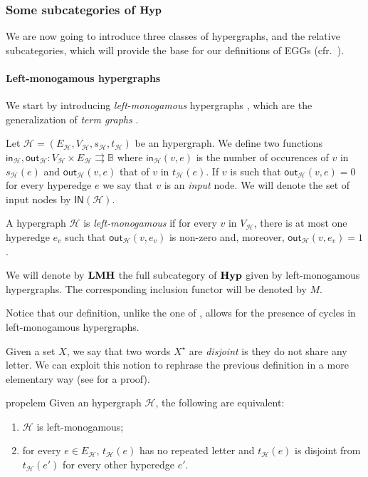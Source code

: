 \documentclass[3p]{elsarticle}
\newcommand{\ind}[1]{\mathsf{in}_{\mathcal{#1}}}
\newcommand{\ino}[1]{\mathsf{IN}({\mathcal{#1}})}
\newcommand{\outd}[1]{\mathsf{out}_{\mathcal{#1}}}
\newcommand{\catname}[1]{\textbf{\textup{#1}}}
\newcommand{\lmo}{\catname{LMH}}
\newcommand{\hyp}{\catname{Hyp}}
\theoremstyle{remark}
\theoremstyle{definition}
\begin{document}
\subsubsection{Some  subcategories of $\hyp$}

We are now going to introduce three classes of hypergraphs, and the relative subcategories, which will provide the base for our definitions of EGGs  (cfr.~). 


\paragraph{Left-monogamous hypergraphs}\label{par:lm}
We start by introducing \emph{left-monogamous} hypergraphs \cite{milosavljevic2023string,fritz2023free}, which are the generalization of \emph{term graphs} \cite{corradini2005term,Plu:TGR-ENTCS}.  

\begin{defi}
	Let $\mathcal{H}=(E_{\mathcal{H}}, V_{\mathcal{H}}, s_{\mathcal{H}}, t_{\mathcal{H}})$ be an hypergraph. We define two functions $\ind{H}, \outd{H}\colon V_{\mathcal{H}}\times E_{\mathcal{H}}\rightrightarrows \mathbb{B}$ where $\ind{H}(v,e)$ is the number of occurences of $v$ in $s_{\mathcal{H}}(e)$ and $\outd{H}(v,e)$ that of $v$ in $t_{\mathcal{H}}(e)$. If $v$ is such that $\outd{H}(v,e)=0$ for every hyperedge $e$ we say that $v$ is an \emph{input} node. We will denote the set of input nodes by $\ino{H}$.
	
	A hypergraph $\mathcal{H}$ is \emph{left-monogamous} if for every $v$ in $V_\mathcal{H}$, there is at most one hyperedge $e_v$ such that $\outd{H}(v,e_v)$ is non-zero and, moreover, $\outd{H}(v,e_v) = 1$.
	
	We will denote by $\lmo$ the full subcategory of $\hyp$ given by left-monogamous hypergraphs. The corresponding inclusion functor will be denoted by $M$.
\end{defi}


\begin{rem}Notice that our definition, unlike the one of \cite{fritz2023free}, allows for the presence of cycles in left-monogamous hypergraphs.
\end{rem}

Given a set $X$, we say that two words $X^\star$ are \emph{disjoint} is they do not share any letter. We can exploit this notion to rephrase the previous definition in a more elementary way (see  for a proof).
\begin{restatable}{prop}{elem}\label{rem:elem} Given an hypergraph $\mathcal{H}$, the following are equivalent:
	\begin{enumerate}
		\item $\mathcal{H}$ is left-monogamous;
		\item for every $e\in E_{\mathcal{H}}$, $t_{\mathcal{H}}(e)$ has no repeated letter and $t_{\mathcal{H}}(e)$ is disjoint from $t_{\mathcal{H}}(e')$ for every other hyperedge $e'$.
	\end{enumerate}
\end{restatable} 
\end{document}
